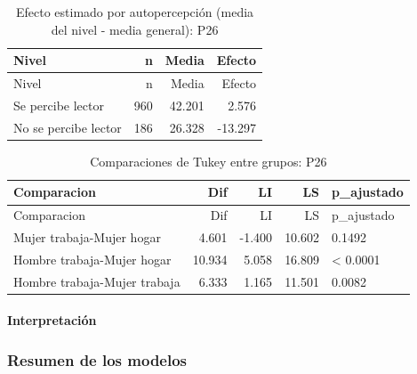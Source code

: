 \documentclass[
  spanish,
  11pt,
]{extarticle}
\begin{document}
\begin{longtable}[]{@{}lrrr@{}}
\caption{Efecto estimado por autopercepción (media del nivel - media
general): P26}\tabularnewline
\toprule\noalign{}
Nivel & n & Media & Efecto \\
\midrule\noalign{}
\endfirsthead
\toprule\noalign{}
Nivel & n & Media & Efecto \\
\midrule\noalign{}
\endhead
\bottomrule\noalign{}
\endlastfoot
Se percibe lector & 960 & 42.201 & 2.576 \\
No se percibe lector & 186 & 26.328 & -13.297 \\
\end{longtable}

\begin{longtable}[]{@{}lrrrl@{}}
\caption{Comparaciones de Tukey entre grupos: P26}\tabularnewline
\toprule\noalign{}
Comparacion & Dif & LI & LS & p\_ajustado \\
\midrule\noalign{}
\endfirsthead
\toprule\noalign{}
Comparacion & Dif & LI & LS & p\_ajustado \\
\midrule\noalign{}
\endhead
\bottomrule\noalign{}
\endlastfoot
Mujer trabaja-Mujer hogar & 4.601 & -1.400 & 10.602 & 0.1492 \\
Hombre trabaja-Mujer hogar & 10.934 & 5.058 & 16.809 & \textless{}
0.0001 \\
Hombre trabaja-Mujer trabaja & 6.333 & 1.165 & 11.501 & 0.0082 \\
\end{longtable}

\paragraph{Interpretación}\label{interpretaciuxf3n-2}

\subsubsection{Resumen de los modelos}\label{resumen-de-los-modelos}
\end{document}
